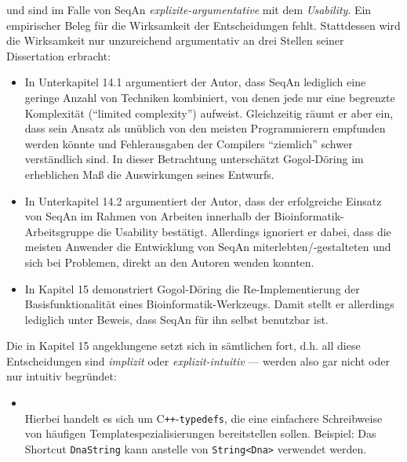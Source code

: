 \begin{description}
   und  sind im Falle von SeqAn \textit{explizite-argumentative}  mit dem  \textit{Usability}. Ein empirischer Beleg für die Wirksamkeit der Entscheidungen fehlt. Stattdessen wird die Wirksamkeit nur unzureichend argumentativ an drei Stellen seiner Dissertation \citep{GogolDoring:2009vz} erbracht:
  \begin{itemize}
    \item In Unterkapitel 14.1 argumentiert der Autor, dass SeqAn lediglich eine geringe Anzahl von Techniken kombiniert, von denen jede nur eine begrenzte Komplexität (``limited complexity'') aufweist. Gleichzeitig räumt er aber ein, dass sein Ansatz als unüblich von den meisten Programmierern empfunden werden könnte und Fehlerausgaben der Compilers ``ziemlich'' schwer verständlich sind. %
    In dieser Betrachtung unterschätzt Gogol-Döring im erheblichen Maß die Auswirkungen seines Entwurfs.
    \item In Unterkapitel 14.2 argumentiert der Autor, dass der erfolgreiche Einsatz von SeqAn im Rahmen von Arbeiten innerhalb der Bioinformatik-Arbeitsgruppe die Usability bestätigt. Allerdings ignoriert er dabei, dass die meisten Anwender die Entwicklung von SeqAn miterlebten/-gestalteten und sich bei Problemen, direkt an den Autoren wenden konnten.
    \item In Kapitel 15 demonstriert Gogol-Döring die Re-Implementierung der Basisfunktionalität eines Bioinformatik-Werkzeugs. Damit stellt er allerdings lediglich unter Beweis, dass SeqAn für ihn selbst benutzbar ist. 
  \end{itemize}
  
  
  Die in Kapitel 15 angeklungene  setzt sich in sämtlichen  fort, d.h. all diese Entscheidungen sind \textit{implizit} oder \textit{explizit-intuitiv} --- werden also gar nicht oder nur intuitiv begründet:
  \begin{itemize}
    \item[\codebullet{apiua://code/-9223372036854775611}] \textbf{} \\
    Hierbei handelt es sich um C{}\verb!++!-\texttt{typedefs}, die eine einfachere Schreibweise von häufigen Templatespezialisierungen bereitstellen sollen. Beispiel: Das Shortcut \texttt{DnaString} kann anstelle von \texttt{String<Dna>} verwendet werden.
    

\end{itemize}
\end{description}
